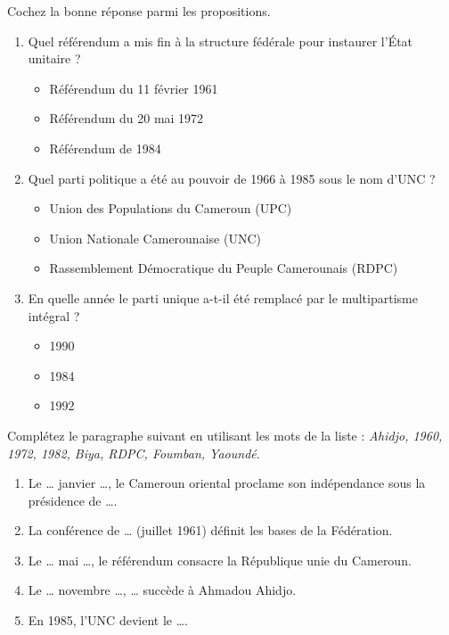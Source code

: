 \documentclass[11pt]{article}
\begin{document}
\begin{exercice}
Cochez la bonne réponse parmi les propositions.
\begin{enumerate}
    \item Quel référendum a mis fin à la structure fédérale pour instaurer l'État unitaire ?
    \begin{itemize}
        \item[A.] Référendum du 11 février 1961
        \item[B.] Référendum du 20 mai 1972
        \item[C.] Référendum de 1984
    \end{itemize}
    \item Quel parti politique a été au pouvoir de 1966 à 1985 sous le nom d'UNC ?
    \begin{itemize}
        \item[A.] Union des Populations du Cameroun (UPC)
        \item[B.] Union Nationale Camerounaise (UNC)
        \item[C.] Rassemblement Démocratique du Peuple Camerounais (RDPC)
    \end{itemize}
    \item En quelle année le parti unique a-t-il été remplacé par le multipartisme intégral ?
    \begin{itemize}
        \item[A.] 1990
        \item[B.] 1984
        \item[C.] 1992
    \end{itemize}
\end{enumerate}
\end{exercice}

\begin{exercice}
Complétez le paragraphe suivant en utilisant les mots de la liste : \textit{Ahidjo, 1960, 1972, 1982, Biya, RDPC, Foumban, Yaoundé}.
\begin{enumerate}
    \item Le \dots{} janvier \dots{}, le Cameroun oriental proclame son indépendance sous la présidence de \dots{}.
    \item La conférence de \dots{} (juillet 1961) définit les bases de la Fédération.
    \item Le \dots{} mai \dots{}, le référendum consacre la République unie du Cameroun.
    \item Le \dots{} novembre \dots{}, \dots{} succède à Ahmadou Ahidjo.
    \item En 1985, l'UNC devient le \dots{}.
\end{enumerate}
\end{exercice}
\end{document}

